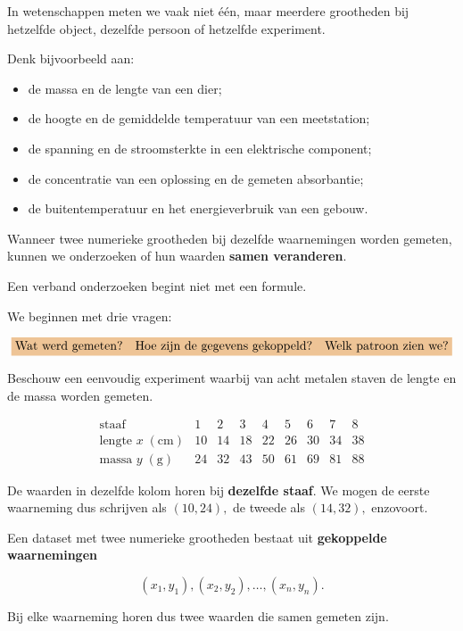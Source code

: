 \documentclass{ximera}
\begin{document}

In wetenschappen meten we vaak niet één, maar meerdere grootheden
bij hetzelfde object, dezelfde persoon of hetzelfde experiment.

Denk bijvoorbeeld aan:

\begin{itemize}
  \item de massa en de lengte van een dier;
  \item de hoogte en de gemiddelde temperatuur van een meetstation;
  \item de spanning en de stroomsterkte in een elektrische component;
  \item de concentratie van een oplossing en de gemeten absorbantie;
  \item de buitentemperatuur en het energieverbruik van een gebouw.
\end{itemize}

Wanneer twee numerieke grootheden bij dezelfde waarnemingen worden
gemeten, kunnen we onderzoeken of hun waarden \textbf{samen veranderen}.

\begin{opmerking}
Een verband onderzoeken begint niet met een formule.

We beginnen met drie vragen:

\[
\important{
\text{Wat werd gemeten?}
\quad
\text{Hoe zijn de gegevens gekoppeld?}
\quad
\text{Welk patroon zien we?}
}
\]
\end{opmerking}



Beschouw een eenvoudig experiment waarbij van acht metalen staven
de lengte en de massa worden gemeten.

\[
\begin{array}{c|cccccccc}
\text{staaf} & 1&2&3&4&5&6&7&8\\ \hline
\text{lengte }x\;(\mathrm{cm})
&10&14&18&22&26&30&34&38\\
\text{massa }y\;(\mathrm{g})
&24&32&43&50&61&69&81&88
\end{array}
\]

De waarden in dezelfde kolom horen bij \textbf{dezelfde staaf}.
We mogen de eerste waarneming dus schrijven als
\(
(10,24),
\)
de tweede als
\(
(14,32),
\)
enzovoort.

\begin{definitie}
Een dataset met twee numerieke grootheden bestaat uit
\textbf{gekoppelde waarnemingen}

\[
(x_1,y_1),(x_2,y_2),\ldots,(x_n,y_n).
\]

Bij elke waarneming horen dus twee waarden die samen gemeten zijn.
\end{definitie}
\end{document}
